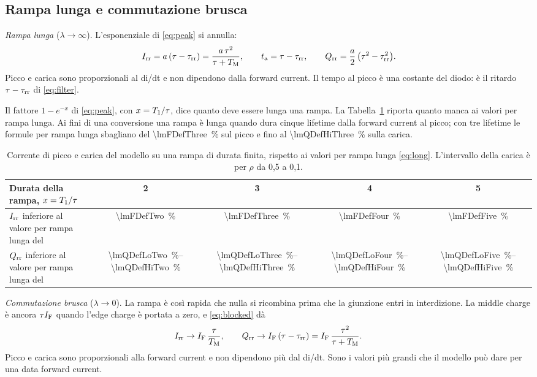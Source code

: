 \documentclass[10pt,a4paper]{scrartcl}
\let\newcommand\lmitdefine
\newcommand{\IF}{I_\mathrm{F}}
\newcommand{\Irr}{I_\mathrm{rr}}
\newcommand{\Qrr}{Q_\mathrm{rr}}
\newcommand{\ta}{t_\mathrm{a}}
\newcommand{\taurr}{\tau_\mathrm{rr}}
\newcommand{\TM}{T_\mathrm{M}}
\newcommand{\Tone}{T_1}
\begin{document}
\subsection{Rampa lunga e commutazione brusca}
\label{sec:limitsramp}
\emph{Rampa lunga} ($\lambda \to \infty$). L'esponenziale di \eqref{eq:peak} si annulla:
\begin{equation}
\Irr = a\,(\tau - \taurr) = \frac{a\,\tau^2}{\tau+\TM} , \qquad \ta = \tau - \taurr , \qquad \Qrr = \frac{a}{2}\,\bigl(\tau^2 - \taurr^2\bigr) .
\label{eq:long}
\end{equation}
Picco e carica sono proporzionali al di/dt e non dipendono dalla forward current. Il tempo al picco è una costante del diodo: è il ritardo $\tau - \taurr$ di \eqref{eq:filter}.

Il fattore $1 - e^{-x}$ di \eqref{eq:peak}, con $x = \Tone/\tau$, dice quanto deve essere lunga una rampa. La Tabella~\ref{tab:long} riporta quanto manca ai valori per rampa lunga. Ai fini di una conversione una rampa è lunga quando dura cinque lifetime dalla forward current al picco; con tre lifetime le formule per rampa lunga sbagliano del \SI{\lmFDefThree}{\percent} sul picco e fino al \SI{\lmQDefHiThree}{\percent} sulla carica.

\begin{table}[htb]
\centering\small
\caption{Corrente di picco e carica del modello su una rampa di durata finita, rispetto ai valori per rampa lunga \eqref{eq:long}. L'intervallo della carica è per $\rho$ da 0,5 a 0,1.}
\label{tab:long}
\begin{tabular}{@{}lcccc@{}}
\toprule
Durata della rampa, $x = \Tone/\tau$ & 2 & 3 & 4 & 5 \\
\midrule
$\Irr$ inferiore al valore per rampa lunga del & \SI{\lmFDefTwo}{\percent} & \SI{\lmFDefThree}{\percent} & \SI{\lmFDefFour}{\percent} & \SI{\lmFDefFive}{\percent} \\
$\Qrr$ inferiore al valore per rampa lunga del & \SIrange{\lmQDefLoTwo}{\lmQDefHiTwo}{\percent} & \SIrange{\lmQDefLoThree}{\lmQDefHiThree}{\percent} & \SIrange{\lmQDefLoFour}{\lmQDefHiFour}{\percent} & \SIrange{\lmQDefLoFive}{\lmQDefHiFive}{\percent} \\
\bottomrule
\end{tabular}
\end{table}

\emph{Commutazione brusca} ($\lambda \to 0$). La rampa è così rapida che nulla si ricombina prima che la giunzione entri in interdizione. La middle charge è ancora $\tau\IF$ quando l'edge charge è portata a zero, e \eqref{eq:blocked} dà
\begin{equation}
\Irr \to \IF\,\frac{\tau}{\TM} , \qquad \Qrr \to \IF\,(\tau - \taurr) = \IF\,\frac{\tau^2}{\tau+\TM} .
\label{eq:abrupt}
\end{equation}
Picco e carica sono proporzionali alla forward current e non dipendono più dal di/dt. Sono i valori più grandi che il modello può dare per una data forward current.
\end{document}
